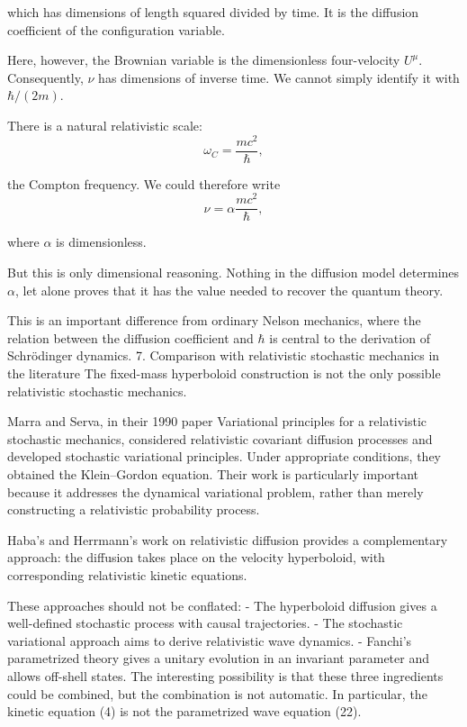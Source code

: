 which has dimensions of length squared divided by time. It is the diffusion coefficient of the configuration variable.

Here, however, the Brownian variable is the dimensionless four-velocity \(U^\mu\). Consequently, \(\nu\) has dimensions of inverse time. We cannot simply identify it with \(\hbar/(2m)\).

There is a natural relativistic scale:
\[
\omega_C=\frac{mc^2}{\hbar},
\tag{26}
\]

the Compton frequency. We could therefore write
\[
\nu=\alpha\frac{mc^2}{\hbar},
\tag{27}
\]

where \(\alpha\) is dimensionless.

But this is only dimensional reasoning. Nothing in the diffusion model determines \(\alpha\), let alone proves that it has the value needed to recover the quantum theory.

This is an important difference from ordinary Nelson mechanics, where the relation between the diffusion coefficient and \(\hbar\) is central to the derivation of Schrödinger dynamics.
7. Comparison with relativistic stochastic mechanics in the literature
The fixed-mass hyperboloid construction is not the only possible relativistic stochastic mechanics.

Marra and Serva, in their 1990 paper Variational principles for a relativistic stochastic mechanics, considered relativistic covariant diffusion processes and developed stochastic variational principles. Under appropriate conditions, they obtained the Klein–Gordon equation. Their work is particularly important because it addresses the dynamical variational problem, rather than merely constructing a relativistic probability process.

Haba's and Herrmann's work on relativistic diffusion provides a complementary approach: the diffusion takes place on the velocity hyperboloid, with corresponding relativistic kinetic equations.

These approaches should not be conflated:
- The hyperboloid diffusion gives a well-defined stochastic process with causal trajectories.
- The stochastic variational approach aims to derive relativistic wave dynamics.
- Fanchi's parametrized theory gives a unitary evolution in an invariant parameter and allows off-shell states.
The interesting possibility is that these three ingredients could be combined, but the combination is not automatic. In particular, the kinetic equation (4) is not the parametrized wave equation (22).

